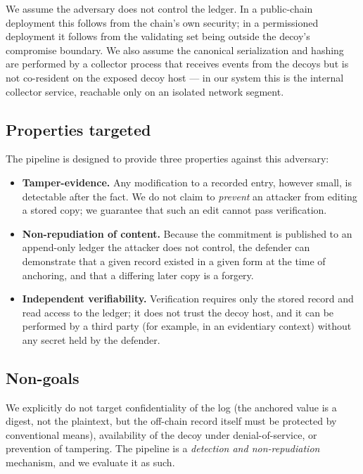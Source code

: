 \documentclass[conference]{IEEEtran}
\begin{document}
We assume the adversary does not control the ledger. In a public-chain deployment this follows from the chain's own security; in a permissioned deployment it follows from the validating set being outside the decoy's compromise boundary. We also assume the canonical serialization and hashing are performed by a collector process that receives events from the decoys but is not co-resident on the exposed decoy host --- in our system this is the internal collector service, reachable only on an isolated network segment.

\subsection{Properties targeted}

The pipeline is designed to provide three properties against this adversary:

\begin{itemize}
\item \textbf{Tamper-evidence.} Any modification to a recorded entry, however small, is detectable after the fact. We do not claim to \emph{prevent} an attacker from editing a stored copy; we guarantee that such an edit cannot pass verification.
\item \textbf{Non-repudiation of content.} Because the commitment is published to an append-only ledger the attacker does not control, the defender can demonstrate that a given record existed in a given form at the time of anchoring, and that a differing later copy is a forgery.
\item \textbf{Independent verifiability.} Verification requires only the stored record and read access to the ledger; it does not trust the decoy host, and it can be performed by a third party (for example, in an evidentiary context) without any secret held by the defender.
\end{itemize}

\subsection{Non-goals}

We explicitly do not target confidentiality of the log (the anchored value is a digest, not the plaintext, but the off-chain record itself must be protected by conventional means), availability of the decoy under denial-of-service, or prevention of tampering. The pipeline is a \emph{detection and non-repudiation} mechanism, and we evaluate it as such.
\end{document}
